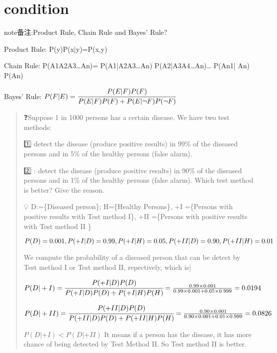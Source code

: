 \documentclass[letterpaper,10pt,english]{sphinxmanual}
\begin{document}
\section{condition}
\label{\detokenize{AI/main:condition}}
\begin{sphinxadmonition}{note}{备注:}{Product Rule, Chain Rule and Bayes’ Rule?}

\begin{DUlineblock}{0em}
\item[] Product Rule: P(y)P(x|y)=P(x,y)
\item[] Chain Rule: P(A1A2A3…An)= P(A1|A2A3…An) P(A2|A3A4…An)… P(An\sphinxhyphen{}1| An) P(An)
\item[] Bayes’ Rule: \(P(F|E)=\cfrac{P(E|F)P(F)}{P(E|F)P(F)+ P(E|\neg F)P(\neg F)}\)
\end{DUlineblock}
\end{sphinxadmonition}
\begin{quote}

\begin{DUlineblock}{0em}
\item[] ❓Suppose 1 in 1000 persons has a certain disease. We have two test methods:
\item[] 1️⃣  detect the disease (produce positive results) in 99\% of the diseased persons and in 5\% of the healthy persons (false alarm).
\item[] 2️⃣ : detect the disease (produce positive results) in 90\% of the diseased persons and in 1\% of the healthy persons (false alarm). Which test method is better? Give the reason.
\item[] 💡
D:=\{Diseased person\}; H=\{Healthy Persons\}, +I =\{Persons with positive results with Test method I\}, +II =\{Persons with positive results with Test method II \}
\item[] \(P(D)=0.001,\\ P(+I|D)=0.99, P(+I|H)=0.05,\\ P(+II|D)=0.90, P(+II|H)=0.01\)
\item[] We compute the probability of a diseased person that can be detect by Test method I or Test method II, repectively, which is|
\item[] \(P(D|+I)= \cfrac{P(+I|D)P(D)}{P(+I|D) P(D)+ P(+I|H) P(H)}=\frac{0.99\times 0.001}{0.99\times0.001+0.05\times0.999}=0.0194\)
\item[] \(P(D|+II)= \cfrac{P(+II|D)P(D)}{P(+II|D) P(D)+ P(+II|H) P(H)}=\frac{0.90\times 0.001}{0.90\times0.001+0.01\times0.999}=0.0826\)
\item[] \(P(D|+ I)< P(D|+ II)\) It means if a person has the disease, it has more chance of being detected by Test Method II. So Test method II is better.
\end{DUlineblock}
\end{quote}
\end{document}
